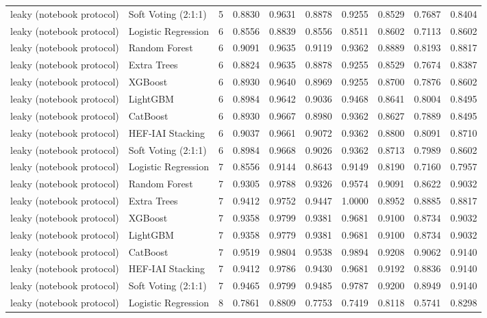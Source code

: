 \begin{tabular}{llrrrrrrrr}
leaky (notebook protocol) & Soft Voting (2:1:1) & 5 & 0.8830 & 0.9631 & 0.8878 & 0.9255 & 0.8529 & 0.7687 & 0.8404 \\
leaky (notebook protocol) & Logistic Regression & 6 & 0.8556 & 0.8839 & 0.8556 & 0.8511 & 0.8602 & 0.7113 & 0.8602 \\
leaky (notebook protocol) & Random Forest & 6 & 0.9091 & 0.9635 & 0.9119 & 0.9362 & 0.8889 & 0.8193 & 0.8817 \\
leaky (notebook protocol) & Extra Trees & 6 & 0.8824 & 0.9635 & 0.8878 & 0.9255 & 0.8529 & 0.7674 & 0.8387 \\
leaky (notebook protocol) & XGBoost & 6 & 0.8930 & 0.9640 & 0.8969 & 0.9255 & 0.8700 & 0.7876 & 0.8602 \\
leaky (notebook protocol) & LightGBM & 6 & 0.8984 & 0.9642 & 0.9036 & 0.9468 & 0.8641 & 0.8004 & 0.8495 \\
leaky (notebook protocol) & CatBoost & 6 & 0.8930 & 0.9667 & 0.8980 & 0.9362 & 0.8627 & 0.7889 & 0.8495 \\
leaky (notebook protocol) & HEF-IAI Stacking & 6 & 0.9037 & 0.9661 & 0.9072 & 0.9362 & 0.8800 & 0.8091 & 0.8710 \\
leaky (notebook protocol) & Soft Voting (2:1:1) & 6 & 0.8984 & 0.9668 & 0.9026 & 0.9362 & 0.8713 & 0.7989 & 0.8602 \\
leaky (notebook protocol) & Logistic Regression & 7 & 0.8556 & 0.9144 & 0.8643 & 0.9149 & 0.8190 & 0.7160 & 0.7957 \\
leaky (notebook protocol) & Random Forest & 7 & 0.9305 & 0.9788 & 0.9326 & 0.9574 & 0.9091 & 0.8622 & 0.9032 \\
leaky (notebook protocol) & Extra Trees & 7 & 0.9412 & 0.9752 & 0.9447 & 1.0000 & 0.8952 & 0.8885 & 0.8817 \\
leaky (notebook protocol) & XGBoost & 7 & 0.9358 & 0.9799 & 0.9381 & 0.9681 & 0.9100 & 0.8734 & 0.9032 \\
leaky (notebook protocol) & LightGBM & 7 & 0.9358 & 0.9779 & 0.9381 & 0.9681 & 0.9100 & 0.8734 & 0.9032 \\
leaky (notebook protocol) & CatBoost & 7 & 0.9519 & 0.9804 & 0.9538 & 0.9894 & 0.9208 & 0.9062 & 0.9140 \\
leaky (notebook protocol) & HEF-IAI Stacking & 7 & 0.9412 & 0.9786 & 0.9430 & 0.9681 & 0.9192 & 0.8836 & 0.9140 \\
leaky (notebook protocol) & Soft Voting (2:1:1) & 7 & 0.9465 & 0.9799 & 0.9485 & 0.9787 & 0.9200 & 0.8949 & 0.9140 \\
leaky (notebook protocol) & Logistic Regression & 8 & 0.7861 & 0.8809 & 0.7753 & 0.7419 & 0.8118 & 0.5741 & 0.8298 \\

\end{tabular}
